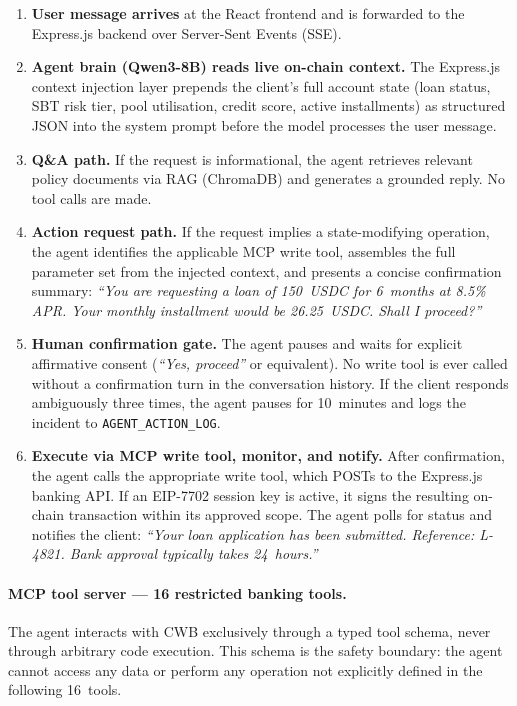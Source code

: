 \documentclass[12pt,a4paper]{report}
\begin{document}
\begin{enumerate}[noitemsep]
\item \textbf{User message arrives} at the React frontend and is forwarded to the Express.js backend over Server-Sent Events (SSE).
\item \textbf{Agent brain (Qwen3-8B) reads live on-chain context.} The Express.js context injection layer prepends the client's full account state (loan status, SBT risk tier, pool utilisation, credit score, active installments) as structured JSON into the system prompt before the model processes the user message.
\item \textbf{Q\&A path.} If the request is informational, the agent retrieves relevant policy documents via RAG (ChromaDB) and generates a grounded reply. No tool calls are made.
\item \textbf{Action request path.} If the request implies a state-modifying operation, the agent identifies the applicable MCP write tool, assembles the full parameter set from the injected context, and presents a concise confirmation summary: \emph{``You are requesting a loan of 150~USDC for 6~months at 8.5\% APR. Your monthly installment would be 26.25~USDC. Shall I proceed?''}
\item \textbf{Human confirmation gate.} The agent pauses and waits for explicit affirmative consent (\emph{``Yes, proceed''} or equivalent). No write tool is ever called without a confirmation turn in the conversation history. If the client responds ambiguously three times, the agent pauses for 10~minutes and logs the incident to \texttt{AGENT\_ACTION\_LOG}.
\item \textbf{Execute via MCP write tool, monitor, and notify.} After confirmation, the agent calls the appropriate write tool, which POSTs to the Express.js banking API. If an EIP-7702 session key is active, it signs the resulting on-chain transaction within its approved scope. The agent polls for status and notifies the client: \emph{``Your loan application has been submitted. Reference: L-4821. Bank approval typically takes 24~hours.''}
\end{enumerate}

\paragraph{MCP tool server --- 16 restricted banking tools.}

The agent interacts with CWB exclusively through a typed tool schema, never through arbitrary code execution. This schema is the safety boundary: the agent cannot access any data or perform any operation not explicitly defined in the following 16~tools.
\end{document}
